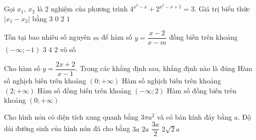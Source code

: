\begin{ex}%
	Gọi $ x_1 $, $ x_2 $ là $ 2 $ nghiệm của phương trình $ 4^{x^2-x}+2^{x^2-x+1}=3 $. Giá trị biểu thức $ \left|x_1-x_2 \right|$ bằng
	\choice
	{$ 3 $}
	{$ 0 $}
	{$ 2 $}
	{\True $ 1 $}
\end{ex}

\begin{ex}%
	Tồn tại bao nhiêu số nguyên $ m $ để hàm số $ y=\dfrac{x-2}{x-m} $ đồng biến trên khoảng $ (-\infty;-1) $
	\choice
	{\True$ 3 $}
	{$ 4 $}
	{$ 2 $}
	{vô số}
\end{ex}

\begin{ex}%
	Cho hàm số $ y= \dfrac{2x+2}{x-1}$. Trong các khẳng định sau, khẳng định nào là đúng
	\choice
	{Hàm số nghịch biến trên khoảng $(0;+\infty)$}
	{\True Hàm số nghịch biến trên khoảng $(2;+\infty)$}
	{Hàm số đồng biến trên khoảng $(-\infty;2)$}
	{Hàm số đồng biến trên khoảng $(0;+\infty)$}
\end{ex}

\begin{ex}%
	Cho hình nón có diện tích xung quanh bằng $ 3\pi a^2 $ và có bán kính đáy bằng $ a $. Độ dài đường sinh của hình nón đã cho bằng
	\choice
	{\True$3a$}
	{$2a$}
	{$\dfrac{3a}{2}$}
	{$2\sqrt{2}a$}
\end{ex}

